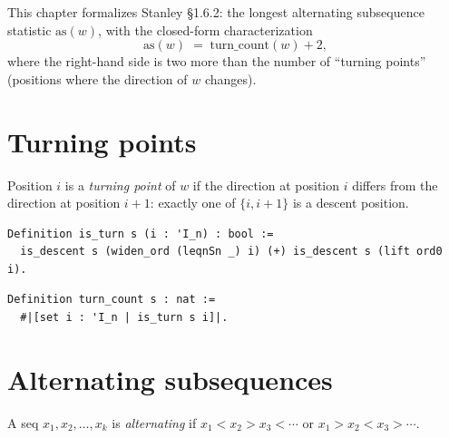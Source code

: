This chapter formalizes Stanley \S1.6.2: the longest alternating
subsequence statistic $\mathrm{as}(w)$, with the closed-form
characterization
\[
  \mathrm{as}(w) \;=\; \mathrm{turn\_count}(w) + 2,
\]
where the right-hand side is two more than the number of
``turning points'' (positions where the direction of $w$ changes).

\section{Turning points}

\begin{definition}
  Position $i$ is a \emph{turning point} of $w$ if the direction at
  position $i$ differs from the direction at position $i+1$:
  exactly one of $\{i, i+1\}$ is a descent position.
\end{definition}

\begin{lstlisting}[language=Rocq]
Definition is_turn s (i : 'I_n) : bool :=
  is_descent s (widen_ord (leqnSn _) i) (+) is_descent s (lift ord0 i).
\end{lstlisting}


\begin{lstlisting}[language=Rocq]
Definition turn_count s : nat :=
  #|[set i : 'I_n | is_turn s i]|.
\end{lstlisting}


\section{Alternating subsequences}

\begin{definition}
  A seq $x_1, x_2, \dots, x_k$ is \emph{alternating} if
  $x_1 < x_2 > x_3 < \cdots$ or $x_1 > x_2 < x_3 > \cdots$.
\end{definition}

